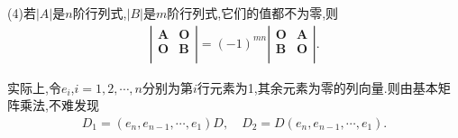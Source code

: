 \documentclass[../../main.tex]{subfiles}%
\begin{document}
\begin{proposition}
(4)若\(\vert A\vert\)是\(n\)阶行列式,\(\vert B\vert\)是\(m\)阶行列式,它们的值都不为零,则
\begin{align*}
\left| \left. \begin{matrix}
\boldsymbol{A}&		\boldsymbol{O}\\
\boldsymbol{O}&		\boldsymbol{B}\\
\end{matrix} \right. \right|=\left( -1 \right) ^{mn}\left. \left| \begin{matrix}
\boldsymbol{O}&		\boldsymbol{A}\\
\boldsymbol{B}&		\boldsymbol{O}\\
\end{matrix} \right| \right. .
\end{align*}
\end{proposition}
\begin{remark}
实际上,令$e_i$,$i=1,2,\cdots,n$分别为第$i$行元素为1,其余元素为零的列向量.则由基本矩阵乘法,不难发现
\begin{align*}
D_1=\left( e_n,e_{n-1},\cdots ,e_1 \right) D,\quad D_2=D\left( e_n,e_{n-1},\cdots ,e_1 \right) .
\end{align*}
\end{remark}
\end{document}
